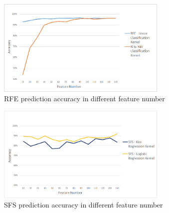 \documentclass[a4paper,twocolumn]{article} %
\begin{document}
	\begin{figure}[hb]
		\begin{center}
			\includegraphics[width=230pt]{RFE_accuracy.png}
			\caption{RFE prediction accuracy in different feature number}
			\label{fig:RFE_accuracy}
		\end{center}
	\end{figure}
	
		\begin{figure}[hb]
		\begin{center}
			\includegraphics[width=230pt]{SFS_accuracy.png}
			\caption{SFS prediction accuracy in different feature number}
			\label{fig:SFS_accuracy}
		\end{center}
	\end{figure}
\end{document}
